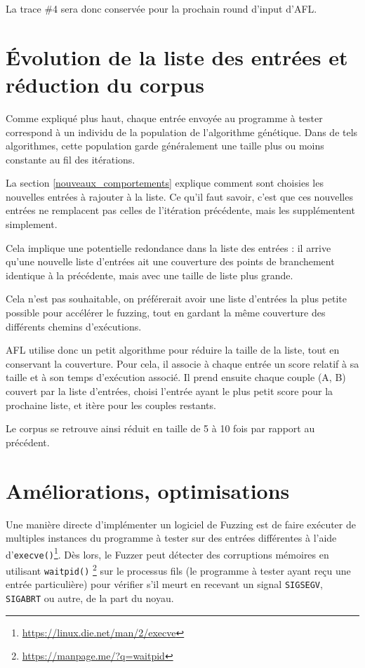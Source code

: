 La trace \#4 sera donc conservée pour la prochain round d'input d'AFL.

\section{Évolution de la liste des entrées et réduction du corpus}

Comme expliqué plus haut, chaque entrée envoyée au programme à tester
correspond à un individu de la population de l'algorithme génétique.
Dans de tels algorithmes, cette population garde généralement une taille
plus ou moins constante au fil des itérations.

La section \ref{nouveaux_comportements} explique comment sont choisies les
nouvelles entrées à rajouter à la liste. Ce qu'il faut savoir, c'est que
ces nouvelles entrées ne remplacent pas celles de l'itération précédente,
mais les supplémentent simplement.

Cela implique une potentielle redondance dans la liste des entrées :
il arrive qu'une nouvelle liste d'entrées ait une couverture des points
de branchement identique à la précédente, mais avec une taille de liste
plus grande.

Cela n'est pas souhaitable, on préférerait avoir une liste d'entrées la
plus petite possible pour accélérer le fuzzing, tout en gardant la même
couverture des différents chemins d'exécutions.

AFL utilise donc un petit algorithme pour réduire la taille de la liste,
tout en conservant la couverture. Pour cela, il associe à chaque entrée
un score relatif à sa taille et à son temps d'exécution associé. Il prend
ensuite chaque couple (A, B) couvert par la liste d'entrées, choisi l'entrée
ayant le plus petit score pour la prochaine liste, et itère pour les couples
restants.

Le corpus se retrouve ainsi réduit en taille de 5 à 10 fois par rapport au
précédent.


\section{Améliorations, optimisations}

Une manière directe d'implémenter un logiciel de Fuzzing est de faire exécuter de multiples instances du programme à tester sur des entrées différentes à l'aide d'\lstinline{execve()}\footnote{\url{https://linux.die.net/man/2/execve}}.
Dès lors, le Fuzzer peut détecter des corruptions mémoires en utilisant \lstinline{waitpid()} \footnote{\url{https://manpage.me/?q=waitpid}} sur le processus fils (le programme à tester ayant reçu une entrée particulière) pour vérifier s'il meurt en recevant un signal \lstinline{SIGSEGV}, \lstinline{SIGABRT} ou autre, de la part du noyau.

